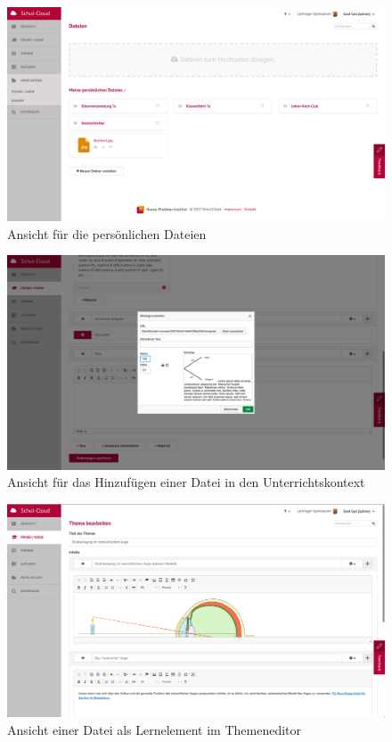 \begin{figure}[H]
	\centering
	\includegraphics[width=1\linewidth]{images/screenMeineDateien}
	\caption{Ansicht für die persönlichen Dateien}
	\label{fig:screenMeineDateien}
\end{figure}

\begin{figure}[H]
	\centering
	\includegraphics[width=1\linewidth]{images/screenCkEditor}
	\caption{Ansicht für das Hinzufügen einer Datei in den Unterrichtskontext}
	\label{fig:screenCkEditor}
\end{figure}

\begin{figure}[H]
	\centering
	\includegraphics[width=1\linewidth]{images/editor_picture}
	\caption{Ansicht einer Datei als Lernelement im Themeneditor}
	\label{fig:screenTopicEditor}
\end{figure}

